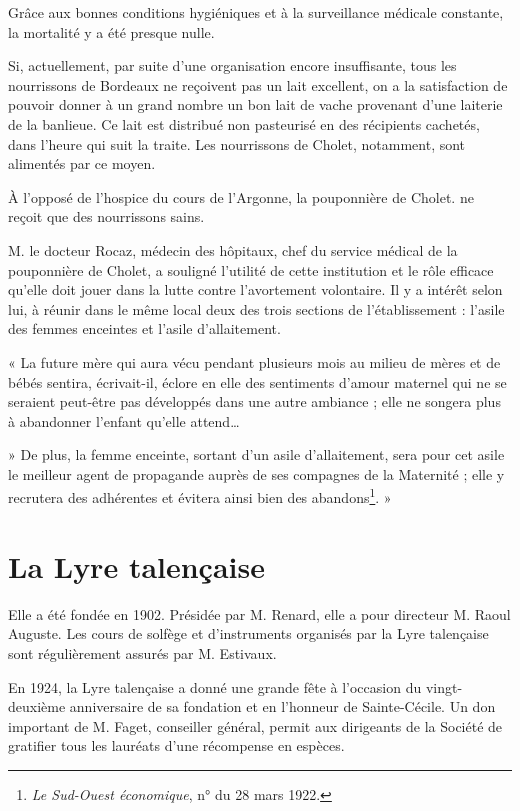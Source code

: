 \documentclass[a4paper,11pt]{book}
\begin{document}
Grâce aux bonnes conditions hygiéniques et à la surveillance médicale constante, la mortalité y a été presque nulle.

Si, actuellement, par suite d'une organisation encore insuffisante, tous les nourrissons de Bordeaux ne reçoivent pas un lait excellent, on a la satisfaction de pouvoir donner à un grand nombre un bon lait de vache provenant d'une laiterie de la banlieue. Ce lait est distribué non pasteurisé en des récipients cachetés, dans l'heure qui suit la traite. Les nourrissons de Cholet, notamment, sont alimentés par ce moyen.

À l'opposé de l'hospice du cours de l'Argonne, la pouponnière de Cholet. ne reçoit que des nourrissons sains. 

M. le docteur Rocaz, médecin des hôpitaux, chef du service médical de la pouponnière de Cholet, a souligné l'utilité de cette institution et le rôle efficace qu'elle doit jouer dans la lutte contre l'avortement volontaire. Il y a intérêt selon lui, à réunir dans le même local deux des trois sections de l'établissement : l'asile des femmes enceintes et l'asile d'allaitement.

« La future mère qui aura vécu pendant plusieurs mois au milieu de mères et de bébés sentira, écrivait-il, éclore en elle des sentiments d'amour maternel qui ne se seraient peut-être pas développés dans une autre ambiance ; elle ne songera plus à abandonner l'enfant qu'elle attend\dots

» De plus, la femme enceinte, sortant d'un asile d'allaitement, sera pour cet asile le meilleur agent de propagande auprès de ses compagnes de la Maternité ; elle y recrutera des adhérentes et évitera ainsi bien des abandons\footnote{\textit{Le Sud-Ouest économique}, n° du 28 mars 1922.}. »

\section{La Lyre talençaise}

Elle a été fondée en 1902. Présidée par M. Renard, elle a pour directeur M. Raoul Auguste. Les cours de solfège et d'instruments organisés par la Lyre talençaise sont régulièrement assurés par M. Estivaux.

En 1924, la Lyre talençaise a donné une grande fête à l'occasion du vingt-deuxième anniversaire de sa fondation et en l'honneur de Sainte-Cécile. Un don important de M. Faget, conseiller général, permit aux dirigeants de la Société de gratifier tous les lauréats d'une récompense en espèces.
\end{document}
